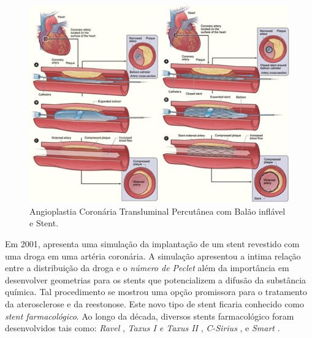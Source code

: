 \begin{figure}[H]
  \centering
  \includegraphics[scale=0.5]{./02_chaps/cap_review/figure/ballon_stent.jpg}
 \caption{Angioplastia Coronária Transluminal Percutânea com Balão inflável e Stent.}
 \label{ballon_stent}
\end{figure}

\medskip
Em 2001, \cite{hwang2001} apresenta uma simulação da implantação de um stent
revestido com uma droga em uma artéria coronária. A simulação apresentou a 
intima relação entre a distribuição da droga e o \textit{número de Peclet} 
além da importância em desenvolver geometrias para os stents que potencializem 
a difusão da substância química. Tal procedimento se mostrou uma opção promissora
para o tratamento da aterosclerose e da reestonose. Este novo tipo de stent
ficaria conhecido como \textit{stent farmacológico}.
Ao longo da década, diversos stents farmacológico foram desenvolvidos tais como:
\textit{Ravel} \cite{morice2002}, 
\textit{Taxus I e Taxus II} \cite{grube2003} \cite{colombo2003}, 
\textit{C-Sirius} \cite{schampaert2004}, 
e \textit{Smart} \cite{ardissino2004}.
